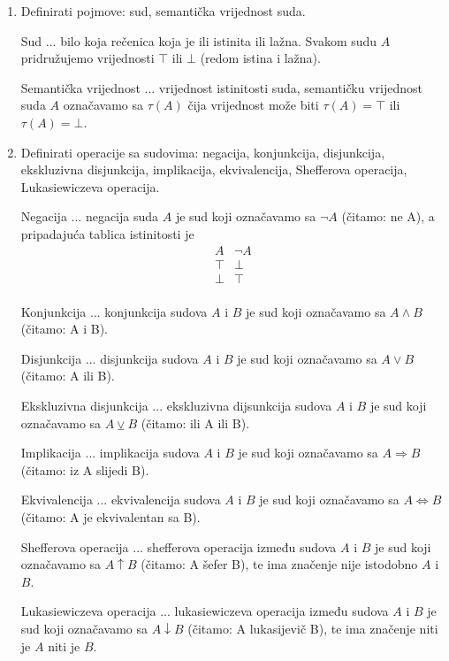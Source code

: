 \documentclass{article}
\begin{document}
\begin{enumerate}

\item Definirati pojmove: sud, semantička vrijednost suda.

Sud ... bilo koja rečenica koja je ili istinita ili lažna. Svakom sudu $A$ pridružujemo vrijednosti $\top$ ili $\bot$ (redom istina i lažna).

Semantička vrijednost ... vrijednost istinitosti suda, semantičku vrijednost suda $A$ označavamo sa $\tau (A)$ čija vrijednost može biti $\tau (A) = \top$ ili $\tau (A) = \bot$.

\item Definirati operacije sa sudovima: negacija, konjunkcija, disjunkcija, ekskluzivna disjunkcija, implikacija, ekvivalencija, Shefferova operacija, Lukasiewiczeva operacija.

Negacija ... negacija suda $A$ je sud koji označavamo sa $\neg A$ (čitamo: ne A), a pripadajuća tablica istinitosti je
\begin{displaymath}
\begin{array}{|c|c|}
A & \neg A\\
\hline
\top & \bot\\
\bot & \top\\
\end{array}
\end{displaymath}

Konjunkcija ... konjunkcija sudova $A$ i $B$ je sud koji označavamo sa $A\land B$ (čitamo: A i B).

Disjunkcija ... disjunkcija sudova $A$ i $B$ je sud koji označavamo sa $A\lor B$ (čitamo: A ili B).

Ekskluzivna disjunkcija ... ekskluzivna dijsunkcija sudova $A$ i $B$ je sud koji označavamo sa $A\veebar B$ (čitamo: ili A ili B).

Implikacija ... implikacija sudova $A$ i $B$ je sud koji označavamo sa $A\Rightarrow B$ (čitamo: iz A slijedi B).

Ekvivalencija ... ekvivalencija sudova $A$ i $B$ je sud koji označavamo sa $A\Leftrightarrow B$ (čitamo: A je ekvivalentan sa B).

Shefferova operacija ... shefferova operacija između sudova $A$ i $B$ je sud koji označavamo sa $A\uparrow B$ (čitamo: A šefer B), te ima značenje nije istodobno $A$ i $B$.

Lukasiewiczeva operacija ... lukasiewiczeva operacija između sudova $A$ i $B$ je sud koji označavamo sa $A\downarrow B$ (čitamo: A lukasijevič B), te ima značenje niti je $A$ niti je $B$.


\end{enumerate}
\end{document}
